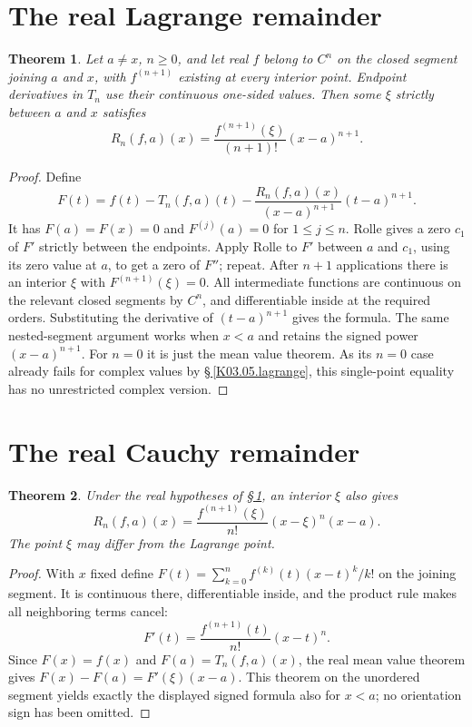 \documentclass[11pt,oneside,a4paper]{book}
\newtheorem{theorem}{Theorem}[chapter]
\theoremstyle{definition}
\theoremstyle{remark}
\newcommand{\KEntry}[2]{\Needspace{7\baselineskip}\section{#2}\label{#1}{\small\sffamily\color{black!60}\detokenize{#1}}\par}
\newcommand{\KRef}[1]{\hyperref[#1]{\S\,\ref*{#1}}}
\begin{document}
\KEntry{K03.06.lagrange}{The real Lagrange remainder}
\begin{theorem}
Let $a\ne x$, $n\ge0$, and let real $f$ belong to $C^n$ on the closed segment joining $a$ and $x$, with $f^{(n+1)}$ existing at every interior point. Endpoint derivatives in $T_n$ use their continuous one-sided values. Then some $\xi$ strictly between $a$ and $x$ satisfies
\[ R_n(f,a)(x)=\frac{f^{(n+1)}(\xi)}{(n+1)!}(x-a)^{n+1}. \]
\end{theorem}
\begin{proof}
Define
\[ F(t)=f(t)-T_n(f,a)(t)-\frac{R_n(f,a)(x)}{(x-a)^{n+1}}(t-a)^{n+1}. \]
It has $F(a)=F(x)=0$ and $F^{(j)}(a)=0$ for $1\le j\le n$. Rolle gives a zero $c_1$ of $F'$ strictly between the endpoints. Apply Rolle to $F'$ between $a$ and $c_1$, using its zero value at $a$, to get a zero of $F''$; repeat. After $n+1$ applications there is an interior $\xi$ with $F^{(n+1)}(\xi)=0$. All intermediate functions are continuous on the relevant closed segments by $C^n$, and differentiable inside at the required orders. Substituting the derivative of $(t-a)^{n+1}$ gives the formula. The same nested-segment argument works when $x<a$ and retains the signed power $(x-a)^{n+1}$. For $n=0$ it is just the mean value theorem. As its $n=0$ case already fails for complex values by \KRef{K03.05.lagrange}, this single-point equality has no unrestricted complex version.
\end{proof}

\KEntry{K03.06.cauchy}{The real Cauchy remainder}
\begin{theorem}
Under the real hypotheses of \KRef{K03.06.lagrange}, an interior $\xi$ also gives
\[ R_n(f,a)(x)=\frac{f^{(n+1)}(\xi)}{n!}(x-\xi)^n(x-a). \]
The point $\xi$ may differ from the Lagrange point.
\end{theorem}
\begin{proof}
With $x$ fixed define $F(t)=\sum_{k=0}^n f^{(k)}(t)(x-t)^k/k!$ on the joining segment. It is continuous there, differentiable inside, and the product rule makes all neighboring terms cancel:
\[ F'(t)=\frac{f^{(n+1)}(t)}{n!}(x-t)^n. \]
Since $F(x)=f(x)$ and $F(a)=T_n(f,a)(x)$, the real mean value theorem gives $F(x)-F(a)=F'(\xi)(x-a)$. This theorem on the unordered segment yields exactly the displayed signed formula also for $x<a$; no orientation sign has been omitted.
\end{proof}
\end{document}

